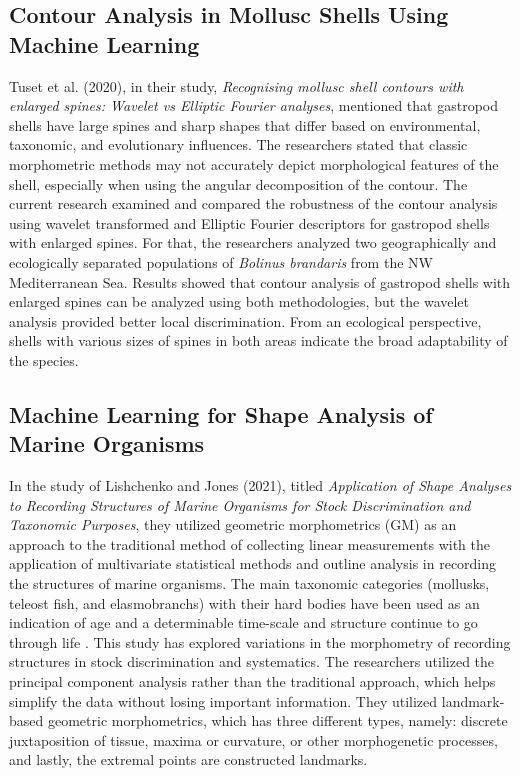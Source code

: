 {\subsection{Contour Analysis in Mollusc Shells Using Machine Learning}
Tuset et al. (2020), in their study, \textit{Recognising mollusc shell contours with enlarged spines: Wavelet vs Elliptic Fourier analyses}, mentioned that gastropod shells have large spines and sharp shapes that differ based on environmental, taxonomic, and evolutionary influences. The researchers stated that classic morphometric methods may not accurately depict morphological features of the shell, especially when using the angular decomposition of the contour. The current research examined and compared the robustness of the contour analysis using wavelet transformed and Elliptic Fourier descriptors for gastropod shells with enlarged spines. For that, the researchers analyzed two geographically and ecologically separated populations of \textit{Bolinus brandaris} from the NW Mediterranean Sea. Results showed that contour analysis of gastropod shells with enlarged spines can be analyzed using both methodologies, but the wavelet analysis provided better local discrimination. From an ecological perspective, shells with various sizes of spines in both areas indicate the broad adaptability of the species.

\subsection{Machine Learning for Shape Analysis of Marine Organisms}
In the study of Lishchenko and Jones (2021), titled \textit{Application of Shape Analyses to Recording Structures of Marine Organisms for Stock Discrimination and Taxonomic Purposes}, they utilized geometric morphometrics (GM) as an approach to the traditional method of collecting linear measurements with the application of multivariate statistical methods and outline analysis in recording the structures of marine organisms. The main taxonomic categories (mollusks, teleost fish, and elasmobranchs) with their hard bodies have been used as an indication of age and a determinable time-scale and structure continue to go through life \cite{arkhipkin2005, kerr2014}. This study has explored variations in the morphometry of recording structures in stock discrimination and systematics. The researchers utilized the principal component analysis rather than the traditional approach, which helps simplify the data without losing important information. They utilized landmark-based geometric morphometrics, which has three different types, namely: discrete juxtaposition of tissue, maxima or curvature, or other morphogenetic processes, and lastly, the extremal points are constructed landmarks.

}
